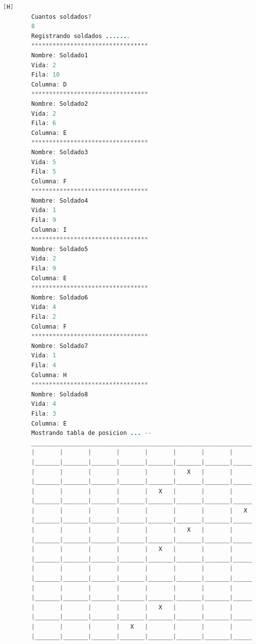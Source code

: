 \documentclass{article}
\begin{document}
	\begin{lstlisting}[language=java,caption={Las lineas de codigos del metodo creado: \textcolor{red}{VER EL TEXTO EN LATEX EN LA IMAGEN SE DEFORMA O EJECUTARLO}}][H]
		Cuantos soldados? 
		8
		Registrando soldados .......
		*********************************
		Nombre: Soldado1
		Vida: 2
		Fila: 10
		Columna: D
		*********************************
		Nombre: Soldado2
		Vida: 2
		Fila: 6
		Columna: E
		*********************************
		Nombre: Soldado3
		Vida: 5
		Fila: 5
		Columna: F
		*********************************
		Nombre: Soldado4
		Vida: 1
		Fila: 9
		Columna: I
		*********************************
		Nombre: Soldado5
		Vida: 2
		Fila: 9
		Columna: E
		*********************************
		Nombre: Soldado6
		Vida: 4
		Fila: 2
		Columna: F
		*********************************
		Nombre: Soldado7
		Vida: 1
		Fila: 4
		Columna: H
		*********************************
		Nombre: Soldado8
		Vida: 4
		Fila: 3
		Columna: E
		Mostrando tabla de posicion ... --
		_________________________________________________________________________________
		|       |       |       |       |       |       |       |       |       |       |
		|_______|_______|_______|_______|_______|_______|_______|_______|_______|_______|
		|       |       |       |       |       |   X   |       |       |       |       |
		|_______|_______|_______|_______|_______|_______|_______|_______|_______|_______|
		|       |       |       |       |   X   |       |       |       |       |       |
		|_______|_______|_______|_______|_______|_______|_______|_______|_______|_______|
		|       |       |       |       |       |       |       |   X   |       |       |
		|_______|_______|_______|_______|_______|_______|_______|_______|_______|_______|
		|       |       |       |       |       |   X   |       |       |       |       |
		|_______|_______|_______|_______|_______|_______|_______|_______|_______|_______|
		|       |       |       |       |   X   |       |       |       |       |       |
		|_______|_______|_______|_______|_______|_______|_______|_______|_______|_______|
		|       |       |       |       |       |       |       |       |       |       |
		|_______|_______|_______|_______|_______|_______|_______|_______|_______|_______|
		|       |       |       |       |       |       |       |       |       |       |
		|_______|_______|_______|_______|_______|_______|_______|_______|_______|_______|
		|       |       |       |       |   X   |       |       |       |   X   |       |
		|_______|_______|_______|_______|_______|_______|_______|_______|_______|_______|
		|       |       |       |   X   |       |       |       |       |       |       |
		|_______|_______|_______|_______|_______|_______|_______|_______|_______|_______|

	\end{lstlisting}
\end{document}
